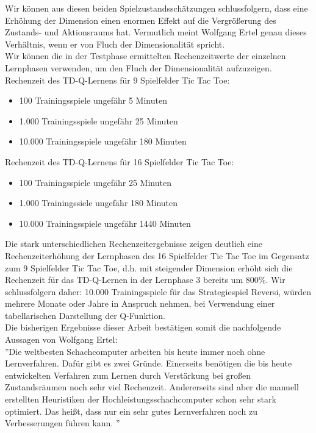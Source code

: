 Wir können aus diesen beiden Spielzustandsschätzungen schlussfolgern, dass eine Erhöhung der Dimension einen enormen Effekt auf die Vergrößerung des Zustands- und Aktionsraums hat. Vermutlich meint Wolfgang Ertel genau dieses Verhältnis, wenn er von Fluch der Dimensionalität spricht. \\

Wir können die in der Testphase ermittelten Rechenzeitwerte der einzelnen Lernphasen verwenden, um den Fluch der Dimensionalität aufzuzeigen. \\

Rechenzeit des TD-Q-Lernens für 9 Spielfelder Tic Tac Toe: 
\begin{itemize}
\item 100 Trainingsspiele ungefähr 5 Minuten 
\item 1.000 Trainingsspiele ungefähr 25 Minuten
\item 10.000 Trainingsspiele ungefähr 180 Minuten
\end{itemize}

Rechenzeit des TD-Q-Lernens für 16 Spielfelder Tic Tac Toe: 
\begin{itemize}
\item 100 Trainingsspiele ungefähr 25 Minuten
\item 1.000 Trainingssiele ungefähr 180 Minuten
\item 10.000 Trainingsspiele ungefähr 1440 Minuten
\end{itemize}

Die stark unterschiedlichen Rechenzeitergebnisse zeigen deutlich eine Rechenzeiterhöhung der Lernphasen des 16 Spielfelder Tic Tac Toe im Gegensatz zum 9 Spielfelder Tic Tac Toe, d.h. mit steigender Dimension erhöht sich die Rechenzeit für das TD-Q-Lernen in der Lernphase 3 bereits um 800\%. Wir schlussfolgern daher: 10.000 Trainingsspiele für das Strategiespiel Reversi, würden mehrere Monate oder Jahre in Anspruch nehmen, bei Verwendung einer tabellarischen Darstellung der Q-Funktion. \\

Die bisherigen Ergebnisse dieser Arbeit bestätigen somit die nachfolgende Aussagen von Wolfgang Ertel: \\

''Die weltbesten Schachcomputer arbeiten bis heute immer noch ohne Lernverfahren. Dafür gibt es zwei Gründe. Einerseits benötigen die bis heute entwickelten Verfahren zum Lernen durch Verstärkung bei großen Zustandsräumen noch sehr viel Rechenzeit. Andererseits sind aber die manuell erstellten Heuristiken der Hochleistungsschachcomputer schon sehr stark optimiert. Das heißt, dass nur ein sehr gutes Lernverfahren noch zu Verbesserungen führen kann. \cite[120]{Ertel}''\\

